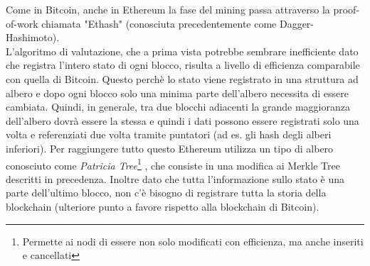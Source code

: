 Come in Bitcoin, anche in Ethereum la fase del mining passa attraverso la proof-of-work chiamata "Ethash" (conosciuta precedentemente come Dagger-Hashimoto)\cite{dh}. \\ L'algoritmo di valutazione, che a prima vista potrebbe sembrare inefficiente dato che registra l'intero stato di ogni blocco, risulta a livello di efficienza comparabile con quella di Bitcoin. Questo perchè lo stato viene registrato in una struttura ad albero e dopo ogni blocco solo una minima parte dell'albero necessita di essere cambiata. Quindi, in generale, tra due blocchi adiacenti la grande maggioranza dell'albero dovrà essere la stessa e quindi i dati possono essere registrati solo una volta e referenziati due volta tramite puntatori (ad es. gli hash degli alberi inferiori). Per raggiungere tutto questo Ethereum utilizza un tipo di albero conosciuto come \emph{Patricia Tree}\footnote{Permette ai nodi di essere non solo modificati con efficienza, ma anche inseriti e cancellati} , che consiste in una modifica ai Merkle Tree descritti in precedenza. Inoltre dato che tutta l'informazione sullo stato è una parte dell'ultimo blocco, non c'è bisogno di registrare tutta la storia della blockchain (ulteriore punto a favore rispetto alla blockchain di Bitcoin). 
%
